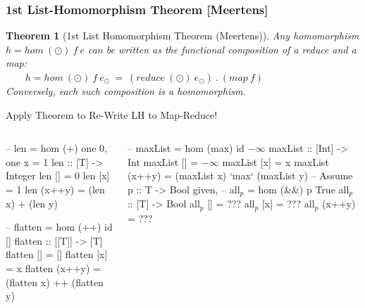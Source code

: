 \documentclass{beamer}
\renewcommand{\emph}[1]{\textcolor{structure}{#1}}
\newcommand{\emp}[1]{\textcolor{DikuRed}{ #1}}
\newcommand{\mymath}[1]{$ #1 $}
\newcommand{\myindx}[1]{_{#1}}
\newtheorem{mytheo}{Theorem}
\begin{document}
\begin{frame}[fragile,t]
  \frametitle{1st List-Homomorphism Theorem [Meertens]}

\begin{mytheo}[1st List Homomorphism Theorem (Meertens)]\label{LHomTh1}
Any homomorphism \emp{$h = hom \ (\odot) \ f \ e$} can be written 
as the functional composition of a reduce and a map: \\
\emp{$\ \ \ \ \ \ \ \ \ h = hom \ (\odot) \ f \ e_{\odot} \ = \ (reduce \ (\odot) \ e_{\odot}) \ . \ (map \ f)$} \\
Conversely, each such composition is a homomorphism. \\
\end{mytheo}


\begin{block}{Apply Theorem to Re-Write LH to Map-Reduce!}
\vspace{-2ex}
\begin{columns}
\begin{colorcode}[fontsize=\scriptsize]
-- \emp{len} = \emp{hom (+) one 0}, one x = 1
len :: [T] -> Integer
len []     = \emp{0}
len [x]    = \emp{1}
\emph{len} (x++y) = (\emph{len} x) \emp{+} (\emph{len} y)

-- \emph{flatten} = \emp{hom (++) id []}
flatten :: [[T]] -> [T]
flatten []     = \emp{[]}
flatten [x]    = \emp{x}
\emph{flatten} (x++y) = (\emph{flatten} x) \emp{++} 
                 (\emph{flatten} y)
\end{colorcode}
\begin{colorcode}[fontsize=\scriptsize]
-- \emph{maxList} = \emp{hom (max) id \mymath{-\infty}} 
maxList :: [Int] -> Int
maxList []     = \emp{\mymath{-\infty}}
maxList [x]    = \emp{x}
\emph{maxList} (x++y) = (\emph{maxList} x) \emp{`max`} 
                 (\emph{maxList} y)
-- Assume p :: T -> Bool given,
-- \emph{all\mymath{\myindx{p}}} = \emp{hom (&&) p True}
all\mymath{\myindx{p}} :: [T] -> Bool
all\mymath{\myindx{p}} []     = \alert{???}
all\mymath{\myindx{p}} [x]    = \alert{???} 
\emph{all\mymath{\myindx{p}}} (x++y) = \alert{???}
\end{colorcode}
\end{columns}
\end{block}


\end{frame}
\end{document}
